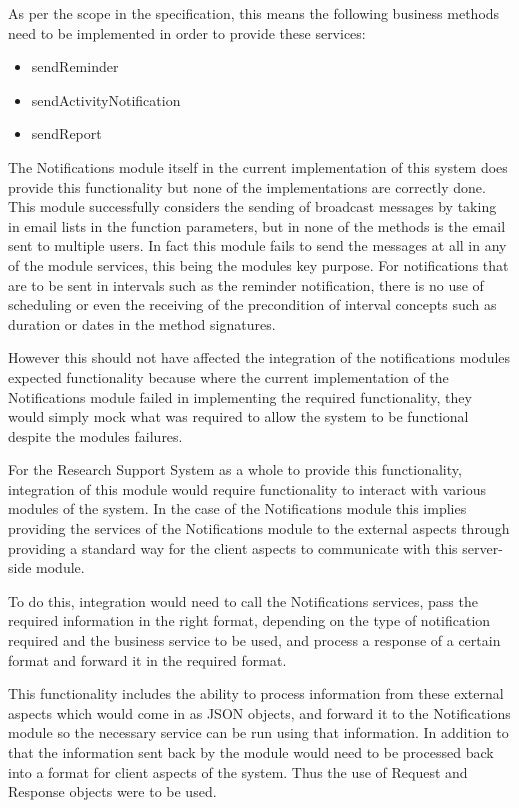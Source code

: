 \documentclass[a4paper,10pt]{article}
\begin{document}
As per the scope in the specification, this means the following business methods need to be implemented in order to provide these services:
\begin{itemize}
	\item sendReminder
    \item sendActivityNotification
    \item sendReport
\end{itemize}

The Notifications module itself in the current implementation of this system does provide this functionality but none of the implementations are correctly done. This module successfully considers the sending of broadcast messages by taking in email lists in the function parameters, but in none of the methods is the email sent to multiple users. In fact this module fails to send the messages at all in any of the module services, this being the modules key purpose. For notifications that are to be sent in intervals such as the reminder notification, there is no use of scheduling or even the receiving of the precondition of interval concepts such as duration or dates in the method signatures.

However this should not have affected the integration of the notifications modules expected functionality because where the current implementation of the Notifications module failed in implementing the required functionality, they would simply mock what was required to allow the system to be functional despite the modules failures.

For the Research Support System as a whole to provide this functionality, integration of this module would require functionality to interact with various modules of the system. In the case of the Notifications module this implies providing the services of the Notifications module to the external aspects through providing a standard way for the client aspects to communicate with this server-side module.

To do this, integration would need to call the Notifications services, pass the required information in the right format, depending on the type of notification required and the business service to be used, and process a response of a certain format and forward it in the required format.

This functionality includes the ability to process information from these external aspects which would come in as JSON objects, and forward it to the Notifications module so the necessary service can be run using that information. In addition to that the information sent back by the module would need to be processed back into a format for client aspects of the system. Thus the use of Request and Response objects were to be used. 
\end{document}

